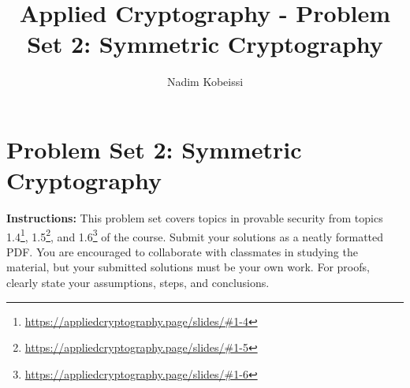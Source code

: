 \documentclass[10pt,a4paper,american]{exam}
\title{Applied Cryptography - Problem Set 2: Symmetric Cryptography}
\author{Nadim Kobeissi}
\begin{document}
\classhandoutheader
\section*{Problem Set 2: Symmetric Cryptography}

\begin{tcolorbox}[colframe=OliveGreen!30!white,colback=OliveGreen!5!white]
	\textbf{Instructions:} This problem set covers topics in provable security from topics 1.4\footnote{\url{https://appliedcryptography.page/slides/\#1-4}}, 1.5\footnote{\url{https://appliedcryptography.page/slides/\#1-5}}, and 1.6\footnote{\url{https://appliedcryptography.page/slides/\#1-6}} of the course. Submit your solutions as a neatly formatted PDF. You are encouraged to collaborate with classmates in studying the material, but your submitted solutions must be your own work. For proofs, clearly state your assumptions, steps, and conclusions.
\end{tcolorbox}
\end{document}
